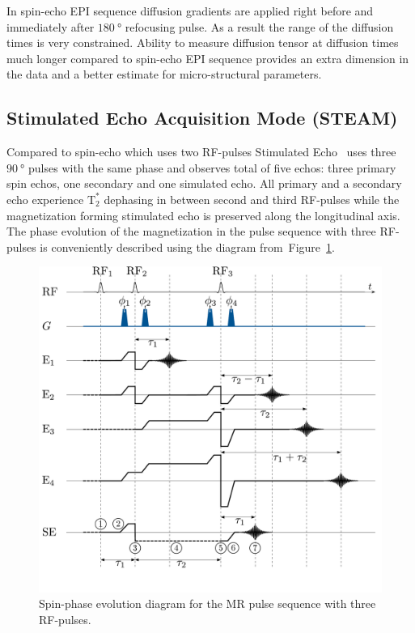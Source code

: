 In spin-echo EPI sequence diffusion gradients are applied right before and immediately after $\SI{180}{\degree}$ refocusing pulse. 
As a result the range of the diffusion times is very constrained. 
Ability to measure diffusion tensor at diffusion times much longer compared to spin-echo EPI sequence provides an extra dimension in the data and a better estimate for micro-structural parameters.
\subsection{Stimulated Echo Acquisition Mode (STEAM)}
Compared to spin-echo which uses two RF-pulses Stimulated Echo~\cite{Hahn} uses three $\SI{90}{\degree}$ pulses with the same phase and observes total of five echos: three primary spin echos, one secondary and one simulated echo. 
All primary and a secondary echo experience $\mathrm{T_2^*}$ dephasing in between second and third RF-pulses while the magnetization forming stimulated echo is preserved along the longitudinal axis. 
The phase evolution of the magnetization in the pulse sequence with three RF-pulses is conveniently described using the diagram from~Figure~\ref{fig: STEAM_phase}.
\begin{figure}[!h]
\vspace{+0.2cm}
\centering
\includegraphics[width=\textwidth]{Figures/STEAM_Phase.pdf}
\caption[Spin-phase evolution diagram for the MR pulse sequence with three RF-pulses]{Spin-phase evolution diagram for the MR pulse sequence with three RF-pulses.}\label{fig: STEAM_phase} 
\end{figure}
